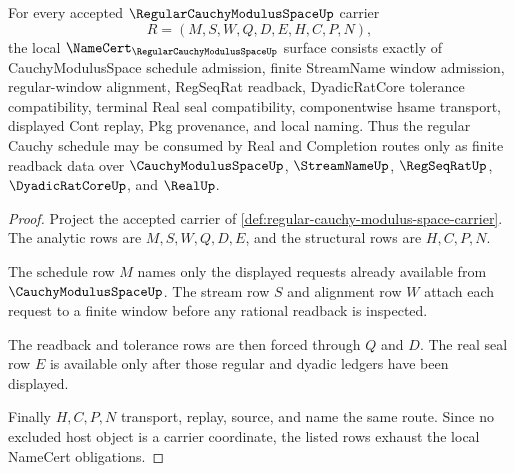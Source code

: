 \begin{theorem}
\label{thm:regular-cauchy-modulus-space-namecert-obligations}
For every accepted $\RegularCauchyModulusSpaceUp$ carrier
$$
R=(M,S,W,Q,D,E,H,C,P,N),
$$
the local $\NameCert_{\RegularCauchyModulusSpaceUp}$ surface consists exactly
of CauchyModulusSpace schedule admission, finite StreamName window admission,
regular-window alignment, RegSeqRat readback, DyadicRatCore tolerance
compatibility, terminal Real seal compatibility, componentwise hsame transport,
displayed Cont replay, Pkg provenance, and local naming. Thus the regular
Cauchy schedule may be consumed by Real and Completion routes only as finite
readback data over $\CauchyModulusSpaceUp$, $\StreamNameUp$, $\RegSeqRatUp$,
$\DyadicRatCoreUp$, and $\RealUp$.
\end{theorem}
\begin{proof}
Project the accepted carrier of
\autoref{def:regular-cauchy-modulus-space-carrier}. The analytic rows are
$M,S,W,Q,D,E$, and the structural rows are $H,C,P,N$.

The schedule row $M$ names only the displayed requests already available from
$\CauchyModulusSpaceUp$. The stream row $S$ and alignment row $W$ attach each
request to a finite window before any rational readback is inspected.

The readback and tolerance rows are then forced through $Q$ and $D$. The real
seal row $E$ is available only after those regular and dyadic ledgers have been
displayed.

Finally $H,C,P,N$ transport, replay, source, and name the same route. Since no
excluded host object is a carrier coordinate, the listed rows exhaust the local
NameCert obligations.
\end{proof}

